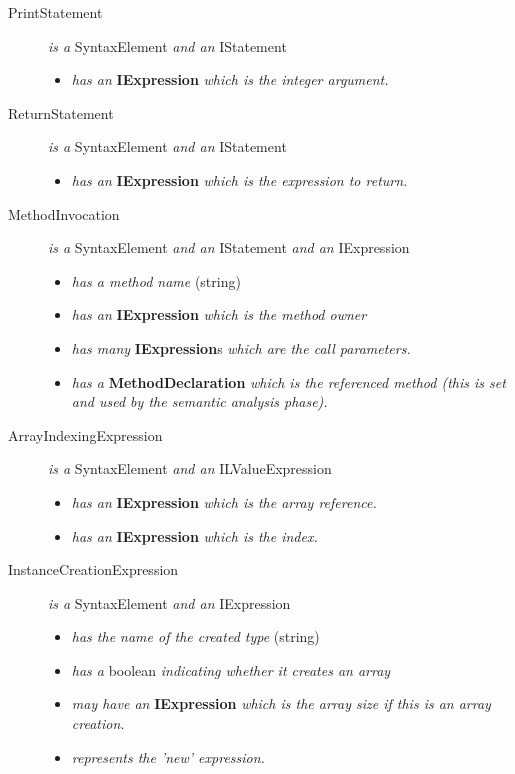 \documentclass[a4paper,11pt]{article}
\begin{document}
\begin{description}
    \item[PrintStatement] \emph{is a} SyntaxElement \emph{and an} IStatement
      \begin{itemize}
        \item \emph{has an} \textbf{IExpression} \emph{which is the integer argument.}
      \end{itemize}
    \item[ReturnStatement] \emph{is a} SyntaxElement \emph{and an} IStatement
      \begin{itemize}
        \item \emph{has an} \textbf{IExpression} \emph{which is the expression to return.}
      \end{itemize}
    \item[MethodInvocation] \emph{is a} SyntaxElement \emph{and an} IStatement \emph{and an} IExpression
      \begin{itemize}
        \item \emph{has a method name} (string)
        \item \emph{has an} \textbf{IExpression} \emph{which is the method owner}
        \item \emph{has many} \textbf{IExpression}s \emph{which are the call parameters.}
        \item \emph{has a} \textbf{MethodDeclaration} \emph{which is the referenced method (this is set and used by the semantic analysis phase).}
      \end{itemize}
    \item[ArrayIndexingExpression] \emph{is a} SyntaxElement \emph{and an} ILValueExpression
      \begin{itemize}
        \item \emph{has an} \textbf{IExpression} \emph{which is the array reference.}
        \item \emph{has an} \textbf{IExpression} \emph{which is the index.}
      \end{itemize}
    \item[InstanceCreationExpression] \emph{is a} SyntaxElement \emph{and an} IExpression
      \begin{itemize}
        \item \emph{has the name of the created type} (string)
        \item \emph{has a} boolean \emph{indicating whether it creates an array}
        \item \emph{may have an} \textbf{IExpression} \emph{which is the array size if this is an array creation.}
        \item \emph{represents the 'new' expression.}

\end{itemize}
\end{description}
\end{document}
